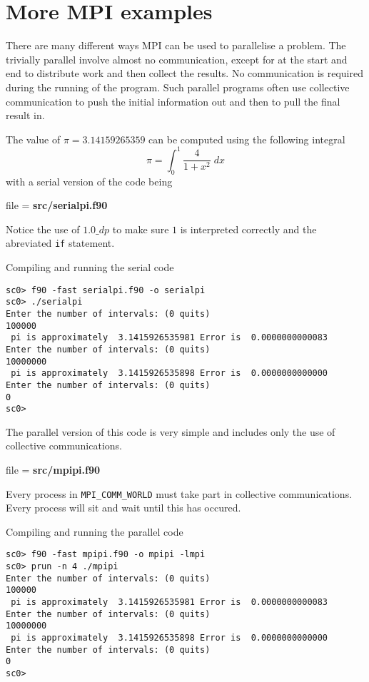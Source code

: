 \documentclass[12pt,a4paper,oneside,openany]{report}
\newcommand{\fcode}[1]{\par \small file = \textbf{#1}  \normalsize}
\newcommand{\code}[1]{\texttt{#1}}
\begin{document}
\section*{More MPI examples}
There are many different ways MPI can be used to parallelise a problem.  The trivially parallel involve almost no communication, except for at the start and end to distribute work and then collect the results.  No communication is required during the running of the program.  Such parallel programs often use collective communication to push the initial information out and then to pull the final result in.

The value of $\pi = 3.14159265359$ can be computed using the following integral
\begin{equation}
\pi = \int_{0}^{1} \frac{4}{1+x^{2}}\;dx
\end{equation}
with a serial version of the code being

\fcode{src/serialpi.f90}

Notice the use of $1.0\_dp$ to make sure $1$ is interpreted correctly and the abreviated \code{if} statement.

Compiling and running the serial code
\begin{verbatim}
sc0> f90 -fast serialpi.f90 -o serialpi
sc0> ./serialpi 
Enter the number of intervals: (0 quits) 
100000
 pi is approximately  3.1415926535981 Error is  0.0000000000083
Enter the number of intervals: (0 quits) 
10000000
 pi is approximately  3.1415926535898 Error is  0.0000000000000
Enter the number of intervals: (0 quits) 
0
sc0> 
\end{verbatim}

\newpage

The parallel version of this code is very simple and includes only the use of collective communications.

\fcode{src/mpipi.f90}

Every process in \code{MPI\_COMM\_WORLD} must take part in collective communications.  Every process will sit and wait until this has occured.

Compiling and running the parallel code
\begin{verbatim}
sc0> f90 -fast mpipi.f90 -o mpipi -lmpi
sc0> prun -n 4 ./mpipi
Enter the number of intervals: (0 quits) 
100000
 pi is approximately  3.1415926535981 Error is  0.0000000000083
Enter the number of intervals: (0 quits) 
10000000
 pi is approximately  3.1415926535898 Error is  0.0000000000000
Enter the number of intervals: (0 quits) 
0
sc0> 
\end{verbatim}
\end{document}
